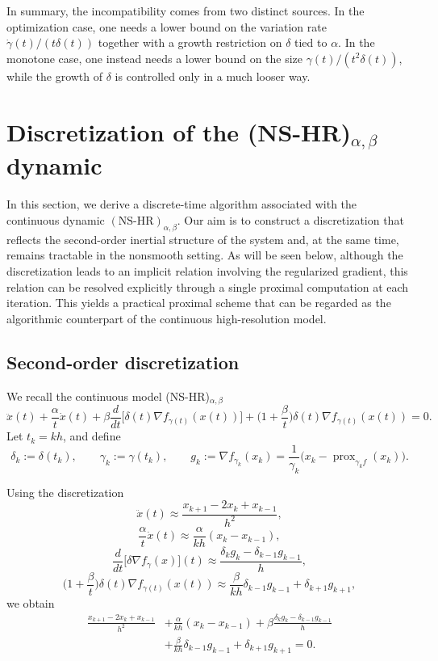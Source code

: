 \documentclass[11pt]{article}
\numberwithin{equation}{section}
\begin{document}
In summary, the incompatibility comes from two distinct sources. In the optimization case, one needs
a lower bound on the {variation rate} $\dot\gamma(t)/(t\delta(t))$ together with a growth restriction
on $\delta$ tied to $\alpha$. In the monotone case, one instead needs a lower bound on the {size}
$\gamma(t)/(t^2\delta(t))$, while the growth of $\delta$ is controlled only in a much looser way. 

\section{Discretization of the (NS-HR)$_{\alpha,\beta}$ dynamic}
In this section, we derive a discrete-time algorithm associated with the continuous dynamic \((\mathrm{NS\text{-}HR})_{\alpha,\beta}\). Our aim is to construct a discretization that reflects the second-order inertial structure of the system and, at the same time, remains tractable in the nonsmooth setting. As will be seen below, although the discretization leads to an implicit relation involving the regularized gradient, this relation can be resolved explicitly through a single proximal computation at each iteration. This yields a practical proximal scheme that can be regarded as the algorithmic counterpart of the continuous high-resolution model. 
\subsection{Second-order discretization}
We recall the continuous model (NS-HR)$_{\alpha,\beta}$
\begin{equation}
\ddot x(t)
+\frac{\alpha}{t}\dot x(t)
+\beta \frac{d}{dt}\!\Big[\delta(t)\nabla f_{\gamma(t)}(x(t))\Big]
+\Big(1+\frac{\beta}{t}\Big)\delta(t)\nabla f_{\gamma(t)}(x(t))
=0.
\end{equation}
Let $t_k = kh$, and define
\[
\delta_k := \delta(t_k),
\qquad
\gamma_k := \gamma(t_k),
\qquad
g_k := \nabla f_{\gamma_k}(x_k)
=\frac{1}{\gamma_k}\Big(x_k-\operatorname{prox}_{\gamma_k f}(x_k)\Big).
\]

Using the discretization
\[
\ddot x(t)
\approx
\frac{x_{k+1}-2x_k+x_{k-1}}{h^2},
\]
\[
\frac{\alpha}{t}\dot x(t)
\approx
\frac{\alpha}{kh}(x_k-x_{k-1}),
\]
\[
\frac{d}{dt}\!\Big[\delta\nabla f_\gamma(x)\Big](t)
\approx
\frac{\delta_k g_k-\delta_{k-1}g_{k-1}}{h},
\]
\[
\Big(1+\frac{\beta}{t}\Big)\delta(t)\nabla f_{\gamma(t)}(x(t))
\approx \frac{\beta}{kh}\delta_{k-1}g_{k-1} + \delta_{k+1}g_{k+1},
\]
we obtain
\begin{align}
\frac{x_{k+1}-2x_k+x_{k-1}}{h^2}
&+
\frac{\alpha}{kh}(x_k-x_{k-1})
+
\beta \frac{\delta_k g_k-\delta_{k-1}g_{k-1}}{h}
\nonumber \\
&+
\frac{\beta}{kh}\delta_{k-1}g_{k-1} + \delta_{k+1}g_{k+1}
=0.
\tag{D-NSHR}
\end{align}
\end{document}
